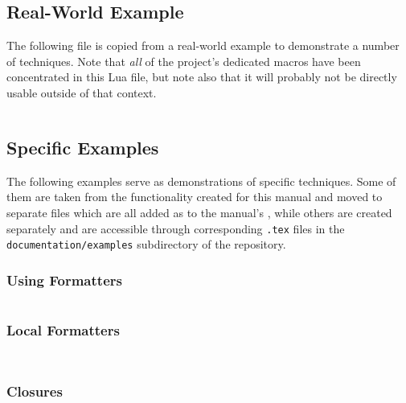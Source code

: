 \documentclass[12pt]{scrartcl}
\begin{document}
\inputminted[firstline=11]{lua}{luaformatters-manual.lua}

\enlargethispage*{4\baselineskip}

\subsection{Real-World Example}
\label{sec:examples:real-world-example}

The following file is copied from a real-world example to demonstrate a number of techniques.  Note that \emph{all} of the project's dedicated macros have been concentrated in this Lua file, but note also that it will probably not be directly usable outside of that context.

\inputminted{lua}{examples/luaformatters-schubert.lua}


\subsection{Specific Examples}
\label{sec:specific-examples}

The following examples serve as demonstrations of specific techniques.  Some of
them are taken from the functionality created for this manual and moved to
separate files which are all added as  to the manual's
, while others are created separately and are accessible
through corresponding \texttt{.tex} files in the \texttt{documentation/examples}
subdirectory of the repository.


\subsubsection{Using Formatters}
\label{sec:examples:using-formatters}

\inputminted{lua}{examples/luaformatters-format.lua}


\subsubsection{Local Formatters}
\label{sec:examples:local-formatters}

\inputminted{lua}{examples/luaformatters-local-formatters.lua}

\inputminted{tex}{examples/luaformatters-local-formatters.tex}


\subsubsection{Closures}
\label{sec:examples:closures}
\end{document}
